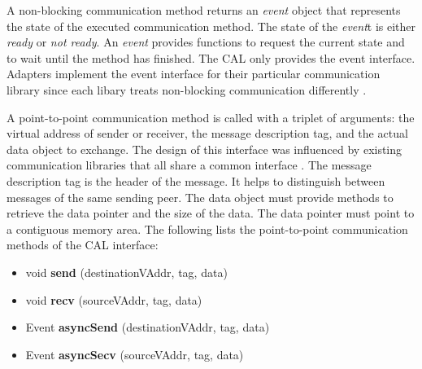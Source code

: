 A non-blocking communication method returns an \emph{event} object that represents
the state of the executed communication method. The state
of the \emph{event}t is either \emph{ready} or \emph{not ready}. An
\emph{event} provides functions to request the current state and 
to  wait until the method has finished. The CAL only provides the
event interface. Adapters implement the  event interface for their
particular communication library since each libary treats non-blocking
communication differently \cite{ref:mpi_specification,ref:boost_asio}.

A point-to-point communication method is called with a triplet of
arguments: the virtual address of sender or receiver, the message
description tag, and the actual data object to exchange.  The design
of this interface was influenced by existing communication libraries
that all share a common interface \cite{ref:boost_mpi, ref:boost_asio,
  ref:zmq}. The message description tag is the header of the
message. It helps to distinguish between messages of the same sending
peer.  The data object must provide methods to retrieve the data
pointer and the size of the data. The data pointer must point to a
contiguous memory area. The following lists the point-to-point
communication methods of the CAL interface:

\begin{itemize}

  \item  void \textbf{send }(destinationVAddr, tag, data)
  \item  void \textbf{recv }(sourceVAddr, tag, data)
  \item  Event \textbf{asyncSend }(destinationVAddr, tag, data)
  \item  Event \textbf{asyncSecv }(sourceVAddr, tag, data)

\end{itemize}

